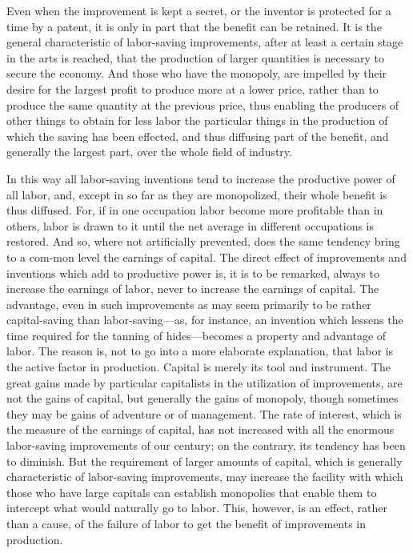 \documentclass{book}
\begin{document}
Even when the improvement is kept a secret, or the inventor is protected for a time by a patent, it is only in part that the benefit can be retained. It is the general characteristic of labor-saving improvements, after at least a certain stage in the arts is reached, that the production of larger quantities is necessary to secure the economy. And those who have the monopoly, are impelled by their desire for the largest profit to produce more at a lower price, rather than to produce the same quantity at the previous price, thus enabling the producers of other things to obtain for less labor the particular things in the production of which the saving has been effected, and thus diffusing part of the benefit, and generally the largest part, over the whole field of industry.

In this way all labor-saving inventions tend to increase the productive power of all labor, and, except in so far as they are monopolized, their whole benefit is thus diffused. For, if in one occupation labor become more profitable than in others, labor is drawn to it until the net average in different occupations is restored. And so, where not artificially prevented, does the same tendency bring to a com-mon level the earnings of capital. The direct effect of improvements and inventions which add to productive power is, it is to be remarked, always to increase the earnings of labor, never to increase the earnings of capital. The advantage, even in such improvements as may seem primarily to be rather capital-saving than labor-saving—as, for instance, an invention which lessens the time required for the tanning of hides—becomes a property and advantage of labor. The reason is, not to go into a more elaborate explanation, that labor is the active factor in production. Capital is merely its tool and instrument. The great gains made by particular capitalists in the utilization of improvements, are not the gains of capital, but generally the gains of monopoly, though sometimes they may be gains of adventure or of management. The rate of interest, which is the measure of the earnings of capital, has not increased with all the enormous labor-saving improvements of our century; on the contrary, its tendency has been to diminish. But the requirement of larger amounts of capital, which is generally characteristic of labor-saving improvements, may increase the facility with which those who have large capitals can establish monopolies that enable them to intercept what would naturally go to labor. This, however, is an effect, rather than a cause, of the failure of labor to get the benefit of improvements in production.
\end{document}
